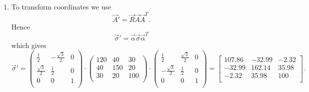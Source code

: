 \begin{derivation}
  \begin{enumerate}[label=(\alph*)]
    \item To transform coordinates we use
      \begin{equation*}
        \Vec{A}' = \Vec{R} \Vec{A} \Vec{A}^{T}
      .\end{equation*}
      Hence
      \begin{equation*}
        \Vec{\sigma}' = \Vec{\alpha} \Vec{\sigma} \Vec{\alpha}^{T}
      \end{equation*}
      which gives
      \begin{equation*}
        \Vec{\sigma}'=\begin{pmatrix}
          \frac{1}{2} & - \frac{\sqrt{3}}{2} & 0\\
          \frac{\sqrt{3}}{2} & \frac{1}{2} & 0\\
        0 & 0 & 1\\
        \end{pmatrix} \cdot \begin{pmatrix}
          120 & 40 & 30\\
        40 & 150 & 20\\
        30 & 20 & 100\\
        \end{pmatrix} \cdot \begin{pmatrix}
  \frac{1}{2} &  \frac{\sqrt{3}}{2} & 0\\
-\frac{\sqrt{3}}{2} & \frac{1}{2} & 0\\
0 & 0 & 1\\
\end{pmatrix} = \begin{bmatrix}
  \num{107,86}  & -\num{32,99}  & -\num{2,32} \\
-\num{32,99}  & \num{162,14}  & \num{35,98} \\
\num{-2,32}  & \num{35,98}  & \num{100} \\
\end{bmatrix}
      .\end{equation*}


\end{enumerate}
\end{derivation}
